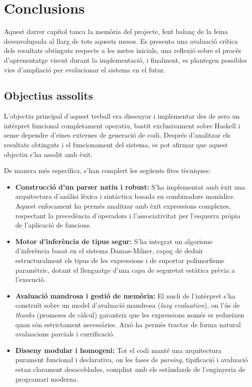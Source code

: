 \chapter{Conclusions}
Aquest darrer capítol tanca la memòria del projecte, fent balanç de la feina desenvolupada al llarg de tots aquests mesos. Es presenta una avaluació crítica dels resultats obtinguts respecte a les metes inicials, una reflexió sobre el procés d'aprenentatge viscut durant la implementació, i finalment, es plantegen possibles vies d'ampliació per evolucionar el sistema en el futur.

\section{Objectius assolits}
L'objectiu principal d'aquest treball era dissenyar i implementar des de zero un intèrpret funcional completament operatiu, bastit exclusivament sobre Haskell i sense dependre d'eines externes de generació de codi. Després d'analitzar els resultats obtinguts i el funcionament del sistema, es pot afirmar que aquest objectiu s'ha assolit amb èxit. 

De manera més específica, s'han complert les següents fites tècniques:
\begin{itemize}
    \item \textbf{Construcció d'un parser natiu i robust:} S'ha implementat amb èxit una arquitectura d'anàlisi lèxica i sintàctica basada en combinadors monàdics. Aquest enfocament ha permès analitzar amb èxit expressions complexes, respectant la precedència d'operadors i l'associativitat per l'esquerra pròpia de l'aplicació de funcions.
    \item \textbf{Motor d'inferència de tipus segur:} S'ha integrat un algorisme d'inferència basat en el sistema Damas-Milner, capaç de deduir estructuralment els tipus de les expressions i de suportar polimorfisme paramètric, dotant el llenguatge d'una capa de seguretat estàtica prèvia a l'execució.
    \item \textbf{Avaluació mandrosa i gestió de memòria:} El nucli de l'intèrpret s'ha construït sobre un model d'avaluació mandrosa (\textit{lazy evaluation}), on l'ús de \textit{thunks} (promeses de càlcul) garanteix que les expressions només es redueixen quan són estrictament necessàries. Això ha permès tractar de forma natural avaluacions parcials i currificació.
    \item \textbf{Disseny modular i homogeni:} Tot el codi manté una arquitectura purament funcional i declarativa, on les fases de \textit{parsing}, tipificació i avaluació estan clarament desacoblades, complint amb els estàndards de l'enginyeria de programari moderna.
\end{itemize}

